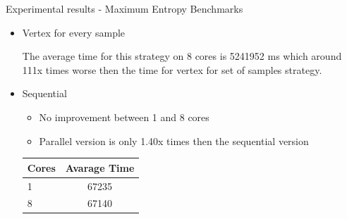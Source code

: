 \documentclass{beamer}
\begin{document}

\begin{frame}{Experimental results - Maximum Entropy Benchmarks}

\begin{itemize}

\item{Vertex for every sample}

The average time for this strategy on 8 cores is 5241952 ms which around 111x times worse then the time for vertex for set of samples strategy.

\item{Sequential}

\begin{itemize}
\item No improvement between 1 and 8 cores
\item Parallel version is only 1.40x times then the sequential version
\end{itemize}

\begin{table}[!htb]
\centering
\begin{tabular}{ l c }
    \hline\hline
    Cores & Avarage Time \\ [0.2ex]
    \hline
    1 & 67235 \\
    8 & 67140  \\
    \hline
  \end{tabular}
\label{table:maxentres2}
\end{table}

\end{itemize}

\end{frame}

\end{document}
